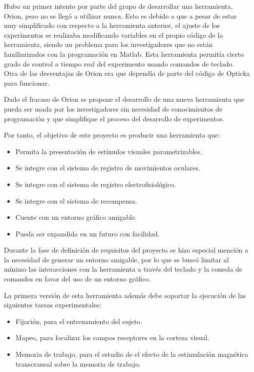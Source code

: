 \documentclass[conference]{IEEEtran}
\begin{document}
Hubo un primer intento por parte del grupo de desarrollar una herramienta, Orion, pero no se llegó a utilizar nunca. Esto es debido a que a pesar de estar muy simplificado con respecto a la herramienta anterior, el ajuste de los experimentos se realizaba modificando variables en el propio código de la herramienta, siendo un problema para los investigadores que no están familiarizados con la programación en Matlab. Esta herramienta permitía cierto grado de control a tiempo real del experimento usando comandos de teclado. Otra de las desventajas de Orion era que dependía de parte del código de Opticka para funcionar.


Dado el fracaso de Orion se propone el desarrollo de una nueva herramienta que pueda ser usada por los investigadores sin necesidad de conocimientos de programación y que simplifique el proceso del desarrollo de experimentos.


Por tanto, el objetivo de este proyecto es producir una herramienta que:

\begin{itemize}
	
	\item Permita la presentación de estímulos visuales parametrizables.
	\item Se integre con el sistema de registro de movimientos oculares.
	\item Se integre con el sistema de registro electrofisiológico.
	\item Se integre con el sistema de recompensa.
	\item Cuente con un entorno gráfico amigable.
	\item Pueda ser expandida en un futuro con facilidad.
\end{itemize}

Durante la fase de definición de requisitos del proyecto se hizo especial mención a la necesidad de generar un entorno amigable, por lo que se buscó limitar al mínimo las interacciones con la herramienta a través del teclado y la consola de comandos en favor del uso de un entorno gráfico.

La primera versión de esta herramienta además debe soportar la ejecución de las siguientes tareas experimentales:

\begin{itemize}
	\item Fijación, para el entrenamiento del sujeto.
	\item Mapeo, para localizar los campos receptores en la corteza visual.
	\item Memoria de trabajo, para el estudio de el efecto de la estimulación magnética transcraneal sobre la memoria de trabajo.
\end{itemize}
\end{document}
